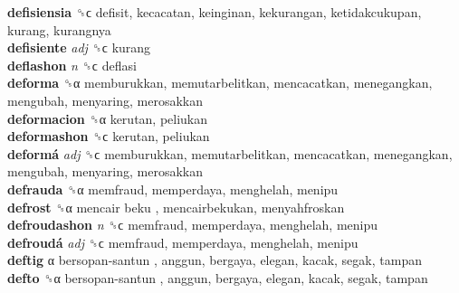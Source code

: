 \textbf{defisiensia} ␝ϲ  defisit, kecacatan, keinginan, kekurangan, ketidakcukupan, kurang, kurangnya  \\
\textbf{defisiente} \emph{adj}  ␝ϲ  kurang  \\
\textbf{deflashon} \emph{n}  ␝ϲ  deflasi  \\
\textbf{deforma} ␝α  memburukkan, memutarbelitkan, mencacatkan, menegangkan, mengubah, menyaring, merosakkan  \\
\textbf{deformacion} ␝α  kerutan, peliukan  \\
\textbf{deformashon} ␝ϲ  kerutan, peliukan  \\
\textbf{deformá} \emph{adj}  ␝ϲ  memburukkan, memutarbelitkan, mencacatkan, menegangkan, mengubah, menyaring, merosakkan  \\
\textbf{defrauda} ␝α  memfraud, memperdaya, menghelah, menipu  \\
\textbf{defrost} ␝α   mencair beku , mencairbekukan, menyahfroskan  \\
\textbf{defroudashon} \emph{n}  ␝ϲ  memfraud, memperdaya, menghelah, menipu  \\
\textbf{defroudá} \emph{adj}  ␝ϲ  memfraud, memperdaya, menghelah, menipu  \\
\textbf{deftig} α   bersopan-santun , anggun, bergaya, elegan, kacak, segak, tampan  \\
\textbf{defto} ␝α   bersopan-santun , anggun, bergaya, elegan, kacak, segak, tampan  \\
